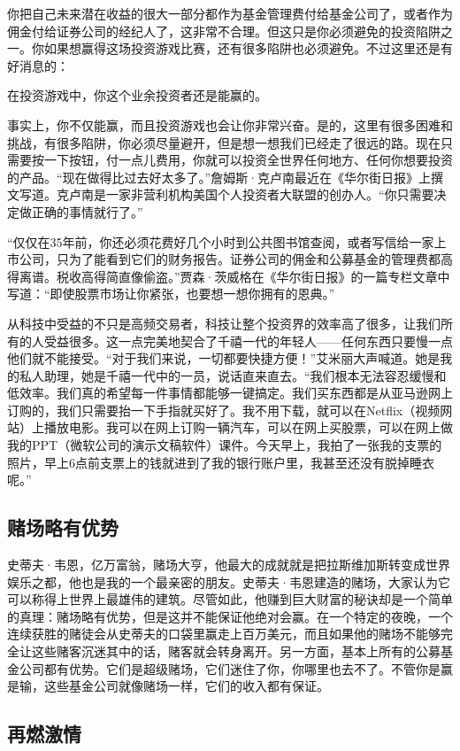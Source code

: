 你把自己未来潜在收益的很大一部分都作为基金管理费付给基金公司了，或者作为佣金付给证券公司的经纪人了，这非常不合理。但这只是你必须避免的投资陷阱之一。你如果想赢得这场投资游戏比赛，还有很多陷阱也必须避免。不过这里还是有好消息的：

在投资游戏中，你这个业余投资者还是能赢的。

事实上，你不仅能赢，而且投资游戏也会让你非常兴奋。是的，这里有很多困难和挑战，有很多陷阱，你必须尽量避开，但是想一想我们已经走了很远的路。现在只需要按一下按钮，付一点儿费用，你就可以投资全世界任何地方、任何你想要投资的产品。“现在做得比过去好太多了。”詹姆斯·克卢南最近在《华尔街日报》上撰文写道。克卢南是一家非营利机构美国个人投资者大联盟的创办人。“你只需要决定做正确的事情就行了。”

“仅仅在35年前，你还必须花费好几个小时到公共图书馆查阅，或者写信给一家上市公司，只为了能看到它们的财务报告。证券公司的佣金和公募基金的管理费都高得离谱。税收高得简直像偷盗。”贾森·茨威格在《华尔街日报》的一篇专栏文章中写道：“即使股票市场让你紧张，也要想一想你拥有的恩典。”

从科技中受益的不只是高频交易者，科技让整个投资界的效率高了很多，让我们所有的人受益很多。这一点完美地契合了千禧一代的年轻人——任何东西只要慢一点他们就不能接受。“对于我们来说，一切都要快捷方便！”艾米丽大声喊道。她是我的私人助理，她是千禧一代中的一员，说话直来直去。“我们根本无法容忍缓慢和低效率。我们真的希望每一件事情都能够一键搞定。我们买东西都是从亚马逊网上订购的，我们只需要抬一下手指就买好了。我不用下载，就可以在Netflix（视频网站）上播放电影。我可以在网上订购一辆汽车，可以在网上买股票，可以在网上做我的PPT（微软公司的演示文稿软件）课件。今天早上，我拍了一张我的支票的照片，早上6点前支票上的钱就进到了我的银行账户里，我甚至还没有脱掉睡衣呢。”

\subsection{赌场略有优势}

史蒂夫·韦恩，亿万富翁，赌场大亨，他最大的成就就是把拉斯维加斯转变成世界娱乐之都，他也是我的一个最亲密的朋友。史蒂夫·韦恩建造的赌场，大家认为它可以称得上世界上最雄伟的建筑。尽管如此，他赚到巨大财富的秘诀却是一个简单的真理：赌场略有优势，但是这并不能保证他绝对会赢。在一个特定的夜晚，一个连续获胜的赌徒会从史蒂夫的口袋里赢走上百万美元，而且如果他的赌场不能够完全让这些赌客沉迷其中的话，赌客就会转身离开。另一方面，基本上所有的公募基金公司都有优势。它们是超级赌场，它们迷住了你，你哪里也去不了。不管你是赢是输，这些基金公司就像赌场一样，它们的收入都有保证。

\subsection{再燃激情}

